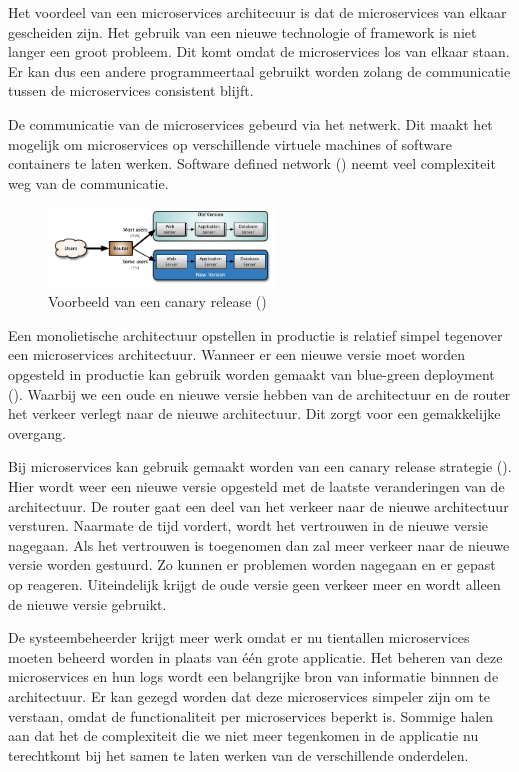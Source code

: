 Het voordeel van een microservices architecuur is dat de microservices van elkaar gescheiden zijn. Het gebruik van een nieuwe technologie of framework is niet langer een groot probleem. Dit komt omdat de microservices los van elkaar staan. Er kan dus een andere programmeertaal gebruikt worden zolang de communicatie tussen de microservices consistent blijft.

De communicatie van de microservices gebeurd via het netwerk. Dit maakt het mogelijk om microservices op verschillende virtuele machines of software containers te laten werken. Software defined network (\cite{garcia_villalba_trends_2015}) neemt veel complexiteit weg van de communicatie.

\begin{figure}
    \centering
    \includegraphics[width=6cm]{img/canary-release}
    \caption{Voorbeeld van een canary release (\cite{danilo_sato_canaryrelease_2014})}
    \label{fig:canary-release}
\end{figure}

Een monolietische architectuur opstellen in productie is relatief simpel tegenover een microservices architectuur. Wanneer er een nieuwe versie moet worden opgesteld in productie kan gebruik worden gemaakt van blue-green deployment (\cite{martin_fowler_bluegreendeployment_2016}). Waarbij we een oude en nieuwe versie hebben van de architectuur en de router het verkeer verlegt naar de nieuwe architectuur. Dit zorgt voor een gemakkelijke overgang.

Bij microservices kan gebruik gemaakt worden van een canary release strategie (\cite{danilo_sato_canaryrelease_2014}). Hier wordt weer een nieuwe versie opgesteld met de laatste veranderingen van de architectuur. De router gaat een deel van het verkeer naar de nieuwe architectuur versturen. Naarmate de tijd vordert, wordt het vertrouwen in de nieuwe versie nagegaan. Als het vertrouwen is toegenomen dan zal meer verkeer naar de nieuwe versie worden gestuurd. Zo kunnen er problemen worden nagegaan en er gepast op reageren. Uiteindelijk krijgt de oude versie geen verkeer meer en wordt alleen de nieuwe versie gebruikt.

De systeembeheerder krijgt meer werk omdat er nu tientallen microservices moeten beheerd worden in plaats van één grote applicatie. Het beheren van deze microservices en hun logs wordt een belangrijke bron van informatie binnnen de architectuur. Er kan gezegd worden dat deze microservices simpeler zijn om te verstaan, omdat de functionaliteit per microservices beperkt is. Sommige halen aan dat het de complexiteit die we niet meer tegenkomen in de applicatie nu terechtkomt bij het samen te laten werken van de verschillende onderdelen.